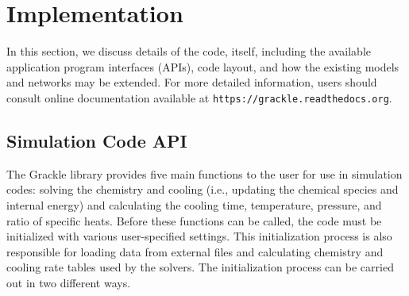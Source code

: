 \section{Implementation} \label{methods:code}

In this section, we discuss details of the code, itself, including the
available application program interfaces (APIs), code layout, and how
the existing models and networks may be extended.  For more detailed
information, users should consult online documentation available at
\texttt{https://grackle.readthedocs.org}.

\subsection{Simulation Code API}

The Grackle library provides five main functions to the user for use
in simulation codes: solving the chemistry and cooling (i.e.,
updating the chemical species and internal energy) and calculating the
cooling time, temperature, pressure, and ratio of specific heats.
Before these functions can be called, the code must be initialized
with various user-specified settings.  This initialization process is
also responsible for loading data from external files and calculating
chemistry and cooling rate tables used by the solvers.  The
initialization process can be carried out in two different ways.

